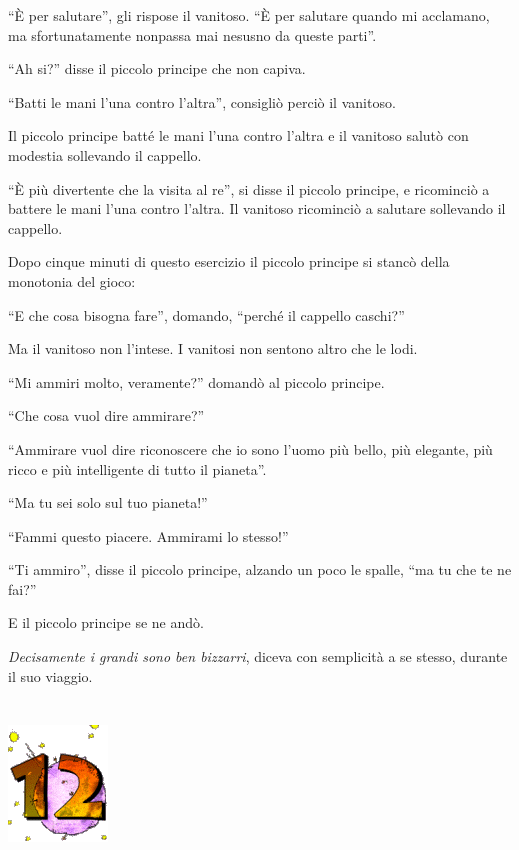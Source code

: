 \documentclass[11pt]{scrbook}
\begin{document}
``È per salutare'', gli rispose il vanitoso. ``È per salutare quando mi acclamano, ma sfortunatamente nonpassa mai nesusno da queste parti''.

``Ah si?'' disse il piccolo principe che non capiva.

``Batti le mani l'una contro l'altra'', consigliò perciò il vanitoso.

Il piccolo principe batté le mani l'una contro l'altra e il vanitoso salutò con modestia sollevando il cappello.

``È più divertente che la visita al re'', si disse il piccolo principe, e ricominciò a battere le mani l'una contro l'altra. Il vanitoso ricominciò a salutare sollevando il cappello.

Dopo cinque minuti di questo esercizio il piccolo principe si stancò della monotonia del gioco:

``E che cosa bisogna fare'', domando, ``perché il cappello caschi?''

Ma il vanitoso non l'intese. I vanitosi non sentono altro che le lodi.

``Mi ammiri molto, veramente?'' domandò al piccolo principe.

``Che cosa vuol dire ammirare?''

``Ammirare vuol dire riconoscere che io sono l'uomo più bello, più elegante, più ricco e più intelligente di tutto il pianeta''.

``Ma tu sei solo sul tuo pianeta!''

``Fammi questo piacere. Ammirami lo stesso!''

``Ti ammiro'', disse il piccolo principe, alzando un poco le spalle, ``ma tu che te ne fai?''

E il piccolo principe se ne andò.

\emph{Decisamente i grandi sono ben bizzarri}, diceva con semplicità a se stesso, durante il suo viaggio.

\chapter{}
\begin{center}
\includegraphics{img/chapter12}
\end{center}
\end{document}
